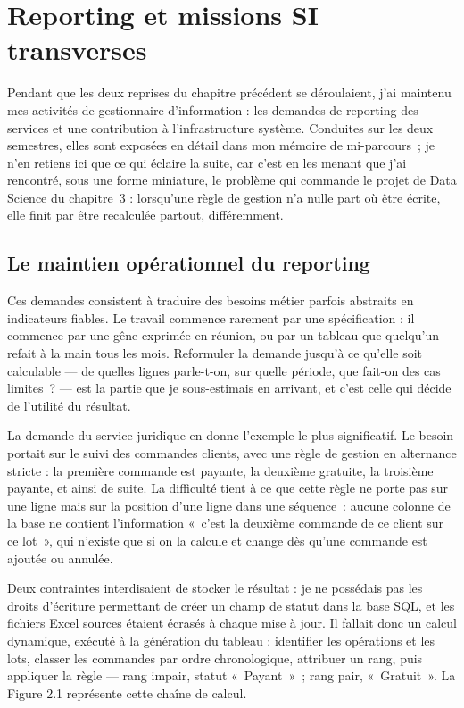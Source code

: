 
\chapter{Reporting et missions SI transverses}
\minitoc
\newpage

Pendant que les deux reprises du chapitre précédent se déroulaient, j'ai maintenu mes
activités de gestionnaire d'information : les demandes de reporting des services et une
contribution à l'infrastructure système. Conduites sur les deux semestres, elles sont exposées
en détail dans mon mémoire de mi-parcours~; je n'en retiens ici que ce qui éclaire la suite,
car c'est en les menant que j'ai rencontré, sous une forme miniature, le problème qui commande
le projet de Data Science du chapitre~3 : lorsqu'une règle de gestion n'a nulle part où être
écrite, elle finit par être recalculée partout, différemment.

\hypertarget{le-maintien-opuxe9rationnel-du-reporting}{%
\section{Le maintien opérationnel du reporting}\label{le-maintien-opuxe9rationnel-du-reporting}}

Ces demandes consistent à traduire des besoins métier parfois abstraits en indicateurs fiables.
Le travail commence rarement par une spécification : il commence par une gêne exprimée en
réunion, ou par un tableau que quelqu'un refait à la main tous les mois. Reformuler la demande
jusqu'à ce qu'elle soit calculable --- de quelles lignes parle-t-on, sur quelle période, que
fait-on des cas limites~? --- est la partie que je sous-estimais en arrivant, et c'est celle qui
décide de l'utilité du résultat.

La demande du service juridique en donne l'exemple le plus significatif. Le besoin portait sur
le suivi des commandes clients, avec une règle de gestion en alternance stricte : la première
commande est payante, la deuxième gratuite, la troisième payante, et ainsi de suite. La
difficulté tient à ce que cette règle ne porte pas sur une ligne mais sur la position d'une
ligne dans une séquence~: aucune colonne de la base ne contient l'information «~c'est la
deuxième commande de ce client sur ce lot~», qui n'existe que si on la calcule et change dès
qu'une commande est ajoutée ou annulée.

Deux contraintes interdisaient de stocker le résultat : je ne possédais pas les droits
d'écriture permettant de créer un champ de statut dans la base SQL, et les fichiers Excel
sources étaient écrasés à chaque mise à jour. Il fallait donc un calcul dynamique, exécuté à
la génération du tableau : identifier les opérations et les lots, classer les commandes par
ordre chronologique, attribuer un rang, puis appliquer la règle --- rang impair, statut
«~Payant~»~; rang pair, «~Gratuit~». La Figure 2.1 représente cette chaîne de calcul.

